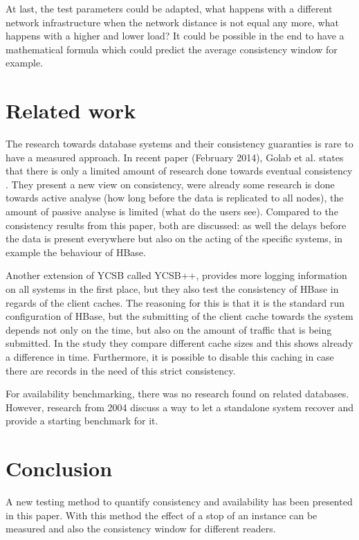 \documentclass[10pt,conference,letterpaper]{IEEEtran}
\begin{document}
At last, the test parameters could be adapted, what happens with a different network infrastructure when the network distance is not equal any more, what happens with a higher and lower load? It could be possible in the end to have a mathematical formula which could predict the average consistency window for example.  


\section{Related work}\label{sec:related work}
The research towards database systems and their consistency guaranties is rare to have a measured approach. In recent paper (February 2014), Golab et al. states that there is only a limited amount of research done towards eventual consistency \cite{golab2014eventually}. They present a new view on consistency, were already some research is done towards active analyse (how long before the data is replicated to all nodes), the amount of passive analyse is limited (what do the users see). Compared to the consistency results from this paper, both are discussed: as well the delays before the data is present everywhere but also on the acting of the specific systems, in example the behaviour of HBase. 

Another extension of YCSB called YCSB++\cite{patil2011ycsb++}, provides more logging information on all systems in the first place, but they also test the consistency of HBase in regards of the client caches. The reasoning for this is that it is the standard run configuration of HBase, but the submitting of the client cache towards the system depends not only on the time, but also on the amount of traffic that is being submitted. In the study they compare different cache sizes and this shows already a difference in time. Furthermore, it is possible to disable this caching in case there are records in the need of this strict consistency. 

For availability benchmarking, there was no research found on related databases. However, research from 2004 \cite{mauro2004system} discuss a way to let a standalone system recover and provide a starting benchmark for it.  


\section{Conclusion}\label{sec:conclusion}
A new testing method to quantify consistency and availability has been presented in this paper. With this method the effect of a stop of an instance can be measured and also the consistency window for different readers. 
\end{document}
